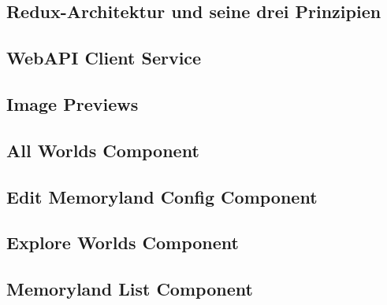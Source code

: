 \subsection{Redux-Architektur und seine drei Prinzipien}


\subsection{WebAPI Client Service}

\subsection{Image Previews}

\subsection{All Worlds Component}

\subsection{Edit Memoryland Config Component}

\subsection{Explore Worlds Component}

\subsection{Memoryland List Component}

